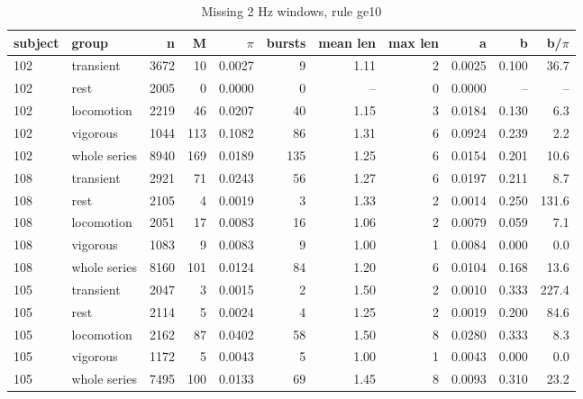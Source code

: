 \begin{table}[ht]
\centering
\small
\begin{tabular}{llrrrrrrrrr}
\toprule
subject & group & n & M & $\pi$ & bursts & mean len & max len & a & b & b/$\pi$ \\
\midrule
102 & transient & 3672 & 10 & 0.0027 & 9 & 1.11 & 2 & 0.0025 & 0.100 & 36.7 \\
102 & rest & 2005 & 0 & 0.0000 & 0 & -- & 0 & 0.0000 & -- & -- \\
102 & locomotion & 2219 & 46 & 0.0207 & 40 & 1.15 & 3 & 0.0184 & 0.130 & 6.3 \\
102 & vigorous & 1044 & 113 & 0.1082 & 86 & 1.31 & 6 & 0.0924 & 0.239 & 2.2 \\
102 & whole series & 8940 & 169 & 0.0189 & 135 & 1.25 & 6 & 0.0154 & 0.201 & 10.6 \\
108 & transient & 2921 & 71 & 0.0243 & 56 & 1.27 & 6 & 0.0197 & 0.211 & 8.7 \\
108 & rest & 2105 & 4 & 0.0019 & 3 & 1.33 & 2 & 0.0014 & 0.250 & 131.6 \\
108 & locomotion & 2051 & 17 & 0.0083 & 16 & 1.06 & 2 & 0.0079 & 0.059 & 7.1 \\
108 & vigorous & 1083 & 9 & 0.0083 & 9 & 1.00 & 1 & 0.0084 & 0.000 & 0.0 \\
108 & whole series & 8160 & 101 & 0.0124 & 84 & 1.20 & 6 & 0.0104 & 0.168 & 13.6 \\
105 & transient & 2047 & 3 & 0.0015 & 2 & 1.50 & 2 & 0.0010 & 0.333 & 227.4 \\
105 & rest & 2114 & 5 & 0.0024 & 4 & 1.25 & 2 & 0.0019 & 0.200 & 84.6 \\
105 & locomotion & 2162 & 87 & 0.0402 & 58 & 1.50 & 8 & 0.0280 & 0.333 & 8.3 \\
105 & vigorous & 1172 & 5 & 0.0043 & 5 & 1.00 & 1 & 0.0043 & 0.000 & 0.0 \\
105 & whole series & 7495 & 100 & 0.0133 & 69 & 1.45 & 8 & 0.0093 & 0.310 & 23.2 \\
\bottomrule
\end{tabular}
\caption{Missing 2 Hz windows, rule ge10}
\end{table}
